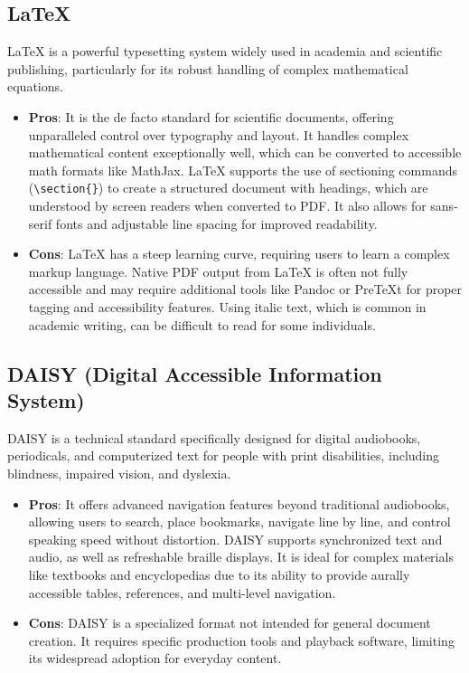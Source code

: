 \subsection{LaTeX}
LaTeX is a powerful typesetting system widely used in academia and scientific publishing, particularly for its robust handling of complex mathematical equations.\cite{CreateUW}
\begin{itemize}
    \item \textbf{Pros}: It is the de facto standard for scientific documents, offering unparalleled control over typography and layout. It handles complex mathematical content exceptionally well, which can be converted to accessible math formats like MathJax.\cite{CreateUW}\cite{LaTeXAccessibility} LaTeX supports the use of sectioning commands (\texttt{\textbackslash section\{\}}) to create a structured document with headings, which are understood by screen readers when converted to PDF.\cite{LancasterLatex} It also allows for sans-serif fonts and adjustable line spacing for improved readability.\cite{LancasterLatex}
    \item \textbf{Cons}: LaTeX has a steep learning curve, requiring users to learn a complex markup language. Native PDF output from LaTeX is often not fully accessible and may require additional tools like Pandoc or PreTeXt for proper tagging and accessibility features.\cite{CreateUW}\cite{LaTeXAccessibility} Using italic text, which is common in academic writing, can be difficult to read for some individuals.\cite{LancasterLatex}
\end{itemize}

\subsection{DAISY (Digital Accessible Information System)}
DAISY is a technical standard specifically designed for digital audiobooks, periodicals, and computerized text for people with print disabilities, including blindness, impaired vision, and dyslexia.\cite{DAISYWiki}
\begin{itemize}
    \item \textbf{Pros}: It offers advanced navigation features beyond traditional audiobooks, allowing users to search, place bookmarks, navigate line by line, and control speaking speed without distortion.\cite{DAISYWiki}\cite{SnowDAISY} DAISY supports synchronized text and audio, as well as refreshable braille displays.\cite{DAISYWiki}\cite{SnowDAISY} It is ideal for complex materials like textbooks and encyclopedias due to its ability to provide aurally accessible tables, references, and multi-level navigation.\cite{DAISYWiki}
    \item \textbf{Cons}: DAISY is a specialized format not intended for general document creation. It requires specific production tools and playback software, limiting its widespread adoption for everyday content.\cite{DAISYWiki}\cite{SnowDAISY}
\end{itemize}

